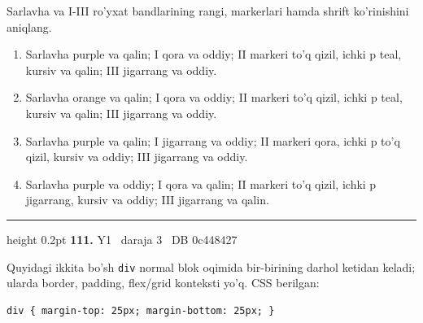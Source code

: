 \documentclass[10pt,a4paper,oneside]{article}
\begin{document}
\par
Sarlavha va I-III ro'yxat bandlarining rangi, markerlari hamda shrift ko'rinishini aniqlang.
\begin{enumerate}[label=\Alph*),leftmargin=9mm]
\item Sarlavha purple va qalin; I qora va oddiy; II markeri to'q qizil, ichki p teal, kursiv va qalin; III jigarrang va oddiy.
\item Sarlavha orange va qalin; I qora va oddiy; II markeri to'q qizil, ichki p teal, kursiv va qalin; III jigarrang va oddiy.
\item Sarlavha purple va qalin; I jigarrang va oddiy; II markeri qora, ichki p to'q qizil, kursiv va oddiy; III jigarrang va oddiy.
\item Sarlavha purple va oddiy; I qora va qalin; II markeri to'q qizil, ichki p jigarrang, kursiv va oddiy; III jigarrang va qalin.
\end{enumerate}
\vspace{2mm}\hrule height 0.2pt \vspace{4mm}
\hypertarget{q111}{\textbf{\color{ink}111.}}  {\color{muted}\scriptsize Y1 \textbullet\ daraja 3 \textbullet\ DB 0c448427}
\par
Quyidagi ikkita bo'sh \texttt{div} normal blok oqimida bir-birining darhol ketidan keladi; ularda border, padding, flex/grid konteksti yo'q. CSS berilgan:

\par
\begin{lstlisting}
div { margin-top: 25px; margin-bottom: 25px; }
\end{lstlisting}
\end{document}
